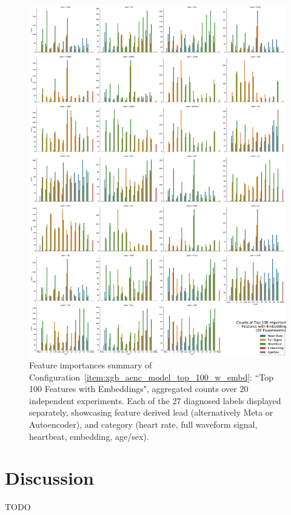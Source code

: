 \documentclass[\main/thesis.tex]{subfiles}
\begin{document}
\begin{figure}[t]
    \centering
    \includegraphics[width=\textwidth]{figure/top_100_feature_importances_all_w_embedding.pdf}
    \caption{Feature importances summary of Configuration~\ref{item:xgb_aenc_model_top_100_w_embd}: ``Top 100 Features with Embeddings", aggregated counts over 20 independent experiments. Each of the 27 diagnosed labels displayed separately, showcasing feature derived lead (alternatively Meta or Autoencoder), and category (heart rate, full waveform signal, heartbeat, embedding, age/sex).}
    \label{fig:xgb_aenc_top_100_features_labelwise}
\end{figure}


\section{Discussion}
TODO

\end{document}
